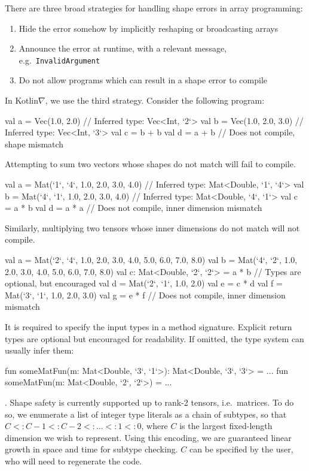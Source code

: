 \documentclass[12pt,initial,twoside,maitrise]{dms}
\numberwithin{equation}{section}
\numberwithin{table}{chapter}
\numberwithin{figure}{chapter}
\begin{document}
\noindent There are three broad strategies for handling shape errors in array programming: \\
%
\begin{enumerate}
    \item Hide the error somehow by implicitly reshaping or broadcasting arrays
    \item Announce the error at runtime, with a relevant message, e.g.\ \texttt{InvalidArgument}
    \item Do not allow programs which can result in a shape error to compile \\
\end{enumerate}
%
In Kotlin$\nabla$, we use the third strategy. Consider the following program:
%
\begin{mylisting}
val a = Vec(1.0, 2.0) // Inferred type: Vec<Int, `2`>
val b = Vec(1.0, 2.0, 3.0) // Inferred type: Vec<Int, `3`>
val c = b + b
val d = a + b // Does not compile, shape mismatch
\end{mylisting}
%
Attempting to sum two vectors whose shapes do not match will fail to compile.
%
\begin{mylisting}
val a = Mat(`1`, `4`, 1.0, 2.0, 3.0, 4.0) // Inferred type: Mat<Double, `1`, `4`>
val b = Mat(`4`, `1`, 1.0, 2.0, 3.0, 4.0) // Inferred type: Mat<Double, `4`, `1`>
val c = a * b
val d = a * a // Does not compile, inner dimension mismatch
\end{mylisting}
%
Similarly, multiplying two tensors whose inner dimensions do not match will not compile.
%
\begin{mylisting}
val a = Mat(`2`, `4`,
            1.0, 2.0, 3.0, 4.0,
            5.0, 6.0, 7.0, 8.0)
val b = Mat(`4`, `2`,
            1.0, 2.0,
            3.0, 4.0,
            5.0, 6.0,
            7.0, 8.0)
val c: Mat<Double, `2`, `2`> = a * b // Types are optional, but encouraged
val d = Mat(`2`, `1`, 1.0, 2.0)
val e = c * d
val f = Mat(`3`, `1`, 1.0, 2.0, 3.0)
val g = e * f // Does not compile, inner dimension mismatch
\end{mylisting}
%
It is required to specify the input types in a method signature. Explicit return types are optional but encouraged for readability. If omitted, the type system can usually infer them:
%
\begin{mylisting}
fun someMatFun(m: Mat<Double, `3`, `1`>): Mat<Double, `3`, `3`> = ...
fun someMatFun(m: Mat<Double, `2`, `2`>) = ...
\end{mylisting}
%
. Shape safety is currently supported up to rank-2 tensors, i.e.\ matrices. To do so, we enumerate a list of integer type literals as a chain of subtypes, so that $C <: C - 1 <: C - 2 <: \dots <: 1 <: 0$, where $C$ is the largest fixed-length dimension we wish to represent. Using this encoding, we are guaranteed linear growth in space and time for subtype checking. $C$ can be specified by the user, who will need to regenerate the code.
\end{document}
